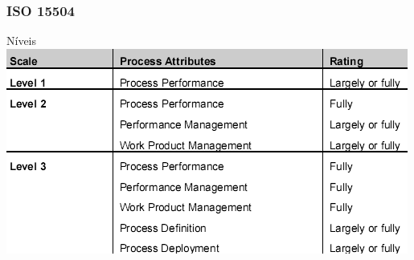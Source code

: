 \begin{frame}[hasnext=false, hasprev=true]
	\frametitle{ISO 15504}

	\begin{block:fact}{Níveis}
		\centering
		\includegraphics[width=\textwidth]{software-engineering/project-management/process/process-quality/iso15504/iso15504-rating-example}
	\end{block:fact}
\end{frame}

